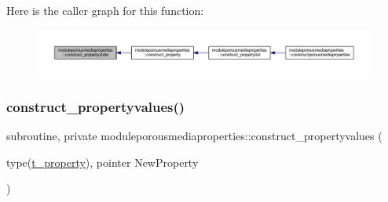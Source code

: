 Here is the caller graph for this function\+:\nopagebreak
\begin{figure}[H]
\begin{center}
\leavevmode
\includegraphics[width=350pt]{namespacemoduleporousmediaproperties_a401ffa0cf421489bbc331e312e10ebd2_icgraph}
\end{center}
\end{figure}
\mbox{\label{namespacemoduleporousmediaproperties_a72fa2352db155b8e701aa97c7aad155c}} 
\subsubsection{\texorpdfstring{construct\+\_\+propertyvalues()}{construct\_propertyvalues()}}
{\footnotesize\ttfamily subroutine, private moduleporousmediaproperties\+::construct\+\_\+propertyvalues (\begin{DoxyParamCaption}\item[{type(\mbox{\hyperlink{structmoduleporousmediaproperties_1_1t__property}{t\+\_\+property}}), pointer}]{New\+Property }\end{DoxyParamCaption})\hspace{0.3cm}{\ttfamily [private]}}


